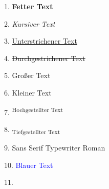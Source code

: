 \documentclass{article}
\begin{document}
1. \textbf{Fetter Text}

2. \textit{Kursiver Text}

3. \underline{Unterstrichener Text}

4. \sout{Durchgestrichener Text}

5. {\large Großer Text}

6. {\small Kleiner Text}

7. \textsuperscript{Hochgestellter Text}

8. \textsubscript{Tiefgestellter Text}

9. {\sffamily Sans Serif} {\ttfamily Typewriter} {\rmfamily Roman}

10. \textcolor{blue}{Blauer Text}

11. 
\end{document}
